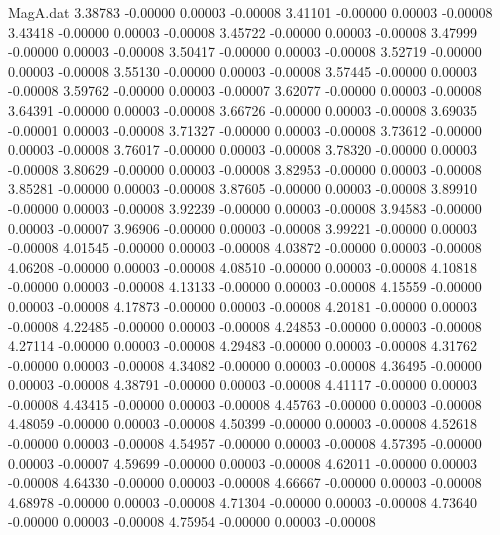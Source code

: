 \begin{filecontents}{MagA.dat}
   3.38783   -0.00000    0.00003   -0.00008
   3.41101   -0.00000    0.00003   -0.00008
   3.43418   -0.00000    0.00003   -0.00008
   3.45722   -0.00000    0.00003   -0.00008
   3.47999   -0.00000    0.00003   -0.00008
   3.50417   -0.00000    0.00003   -0.00008
   3.52719   -0.00000    0.00003   -0.00008
   3.55130   -0.00000    0.00003   -0.00008
   3.57445   -0.00000    0.00003   -0.00008
   3.59762   -0.00000    0.00003   -0.00007
   3.62077   -0.00000    0.00003   -0.00008
   3.64391   -0.00000    0.00003   -0.00008
   3.66726   -0.00000    0.00003   -0.00008
   3.69035   -0.00001    0.00003   -0.00008
   3.71327   -0.00000    0.00003   -0.00008
   3.73612   -0.00000    0.00003   -0.00008
   3.76017   -0.00000    0.00003   -0.00008
   3.78320   -0.00000    0.00003   -0.00008
   3.80629   -0.00000    0.00003   -0.00008
   3.82953   -0.00000    0.00003   -0.00008
   3.85281   -0.00000    0.00003   -0.00008
   3.87605   -0.00000    0.00003   -0.00008
   3.89910   -0.00000    0.00003   -0.00008
   3.92239   -0.00000    0.00003   -0.00008
   3.94583   -0.00000    0.00003   -0.00007
   3.96906   -0.00000    0.00003   -0.00008
   3.99221   -0.00000    0.00003   -0.00008
   4.01545   -0.00000    0.00003   -0.00008
   4.03872   -0.00000    0.00003   -0.00008
   4.06208   -0.00000    0.00003   -0.00008
   4.08510   -0.00000    0.00003   -0.00008
   4.10818   -0.00000    0.00003   -0.00008
   4.13133   -0.00000    0.00003   -0.00008
   4.15559   -0.00000    0.00003   -0.00008
   4.17873   -0.00000    0.00003   -0.00008
   4.20181   -0.00000    0.00003   -0.00008
   4.22485   -0.00000    0.00003   -0.00008
   4.24853   -0.00000    0.00003   -0.00008
   4.27114   -0.00000    0.00003   -0.00008
   4.29483   -0.00000    0.00003   -0.00008
   4.31762   -0.00000    0.00003   -0.00008
   4.34082   -0.00000    0.00003   -0.00008
   4.36495   -0.00000    0.00003   -0.00008
   4.38791   -0.00000    0.00003   -0.00008
   4.41117   -0.00000    0.00003   -0.00008
   4.43415   -0.00000    0.00003   -0.00008
   4.45763   -0.00000    0.00003   -0.00008
   4.48059   -0.00000    0.00003   -0.00008
   4.50399   -0.00000    0.00003   -0.00008
   4.52618   -0.00000    0.00003   -0.00008
   4.54957   -0.00000    0.00003   -0.00008
   4.57395   -0.00000    0.00003   -0.00007
   4.59699   -0.00000    0.00003   -0.00008
   4.62011   -0.00000    0.00003   -0.00008
   4.64330   -0.00000    0.00003   -0.00008
   4.66667   -0.00000    0.00003   -0.00008
   4.68978   -0.00000    0.00003   -0.00008
   4.71304   -0.00000    0.00003   -0.00008
   4.73640   -0.00000    0.00003   -0.00008
   4.75954   -0.00000    0.00003   -0.00008

\end{filecontents}
